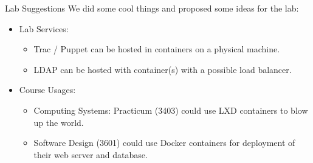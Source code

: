 \documentclass[xcolor=dvipsnames,aspectratio=1610]{beamer}
\begin{document}
  \begin{frame}{Lab Suggestions}
    We did some cool things and proposed some ideas for the lab:

    \begin{itemize}
        \item \alert{Lab Services}:
        \begin{itemize}
            \item Trac / Puppet can be hosted in containers on a physical machine.
            \item LDAP can be hosted with container(s) with a possible load balancer.
        \end{itemize}

        \item \alert{Course Usages}:
        \begin{itemize}
            \item Computing Systems: Practicum (3403) could use LXD containers to blow up the world.
            \item Software Design (3601) could use Docker containers for deployment of their web server and database.
        \end{itemize}
    \end{itemize}
  \end{frame}
\end{document}
